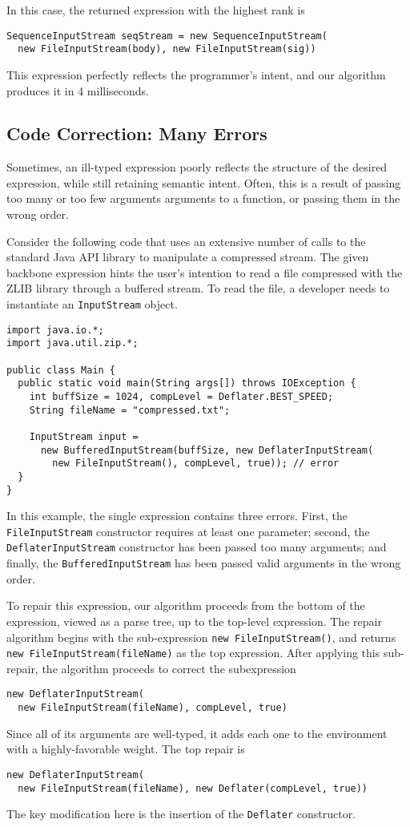 In this case, the returned expression with the highest rank is
\begin{lstlisting}
SequenceInputStream seqStream = new SequenceInputStream(
  new FileInputStream(body), new FileInputStream(sig))
\end{lstlisting}
This expression perfectly reflects the programmer's intent, and our algorithm produces it in 4 milliseconds.

\subsection{Code Correction: Many Errors}
Sometimes, an ill-typed expression poorly reflects the structure of the desired expression, while still retaining semantic intent. Often, this is a result of passing too many or too few arguments arguments to a function, or passing them in the wrong order.

Consider the following code that uses an extensive number of calls to the standard Java API library to manipulate a compressed stream. The given backbone expression hints the user's intention to read a file compressed with the ZLIB library through a buffered stream. To read the file, a developer needs to instantiate an \lstinline{InputStream} object.
\begin{lstlisting}
import java.io.*;
import java.util.zip.*;

public class Main {
  public static void main(String args[]) throws IOException {
    int buffSize = 1024, compLevel = Deflater.BEST_SPEED;
    String fileName = "compressed.txt";
    
    InputStream input = 
      new BufferedInputStream(buffSize, new DeflaterInputStream(
        new FileInputStream(), compLevel, true)); // error 
  }
}
\end{lstlisting}
In this example, the single expression contains three errors. First, the \lstinline{FileInputStream} constructor requires at least one parameter; second, the \lstinline{DeflaterInputStream} constructor has been passed too many arguments; and finally, the \lstinline{BufferedInputStream} has been passed valid arguments in the wrong order.

To repair this expression, our algorithm proceeds from the bottom of the expression, viewed as a parse tree, up to the top-level expression. The repair algorithm begins with the sub-expression \lstinline{new FileInputStream()}, and returns \lstinline{new FileInputStream(fileName)} as the top expression. After applying this sub-repair, the algorithm proceeds to correct the subexpression
\begin{lstlisting}
new DeflaterInputStream(
  new FileInputStream(fileName), compLevel, true)
\end{lstlisting}
Since all of its arguments are well-typed, it adds each one to the environment with a highly-favorable weight. The top repair is
\begin{lstlisting}
new DeflaterInputStream(
  new FileInputStream(fileName), new Deflater(compLevel, true))
\end{lstlisting}
The key modification here is the insertion of the \lstinline{Deflater} constructor.

